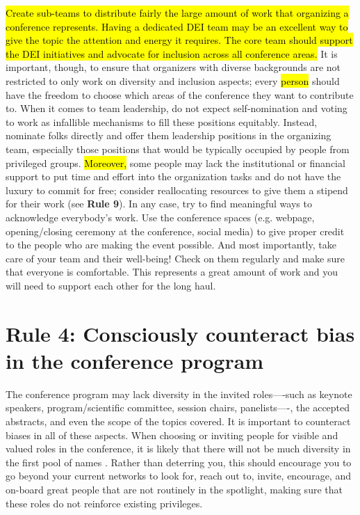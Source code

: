 \documentclass[10pt,letterpaper]{article}
\begin{document}
 \hl{Create sub-teams to distribute fairly the large amount of work that organizing a conference represents. 
Having a dedicated DEI team may be an excellent way to give the topic the attention and energy it requires.
The core team should support the DEI initiatives and advocate for inclusion across all conference areas.}  
It is important, though, to ensure that organizers with diverse backgrounds are not restricted to only work on diversity and inclusion aspects; 
every \hl{person} should have the freedom to choose which areas of the conference they want to contribute to.
When it comes to team leadership, do not expect self-nomination and voting to work as infallible mechanisms to fill these positions equitably. 
Instead, nominate folks directly and offer them leadership positions in the organizing team, especially those positions that would be typically occupied by people from privileged groups.
\hl{Moreover,} some people may lack the institutional or financial support to put time and effort into the organization tasks and do not have the luxury to commit for free; consider reallocating resources to give them a stipend for their work (see \textbf{Rule 9}).
In any case, try to find meaningful ways to acknowledge everybody's work. Use the conference spaces (e.g. webpage, opening/closing ceremony at the conference, social media) to give proper credit to the people who are making the event possible.
And most importantly, take care of your team and their well-being! Check on them regularly and make sure that everyone is comfortable. This represents a great amount of work and you will need to support each other for the long haul.


\section*{Rule 4: Consciously counteract bias in the conference program}
\label{rule_unbias}

The conference program may lack diversity in the invited roles––-such as keynote speakers, program/scientific committee, session chairs, panelists––-, the accepted abstracts, and even the scope of the topics covered. 
It is important to counteract biases in all of these aspects.
When choosing or inviting people for visible and valued roles in the conference, it is likely that there will not be much diversity in the first pool of names \cite{dwyerNoticeWhoScience2021,swartzScienceValueDiversity2019,wongBuildDiversityScience2020,dignazioUnicornsJanitorsNinjas2020}.
Rather than deterring you, this should encourage you to go beyond your current networks to look for, reach out to, invite, encourage, and on-board great people that are not routinely in the spotlight, making sure that these roles do not reinforce existing privileges.
\end{document}
